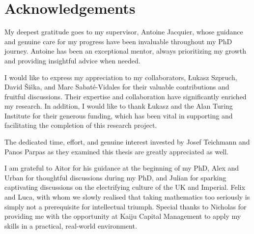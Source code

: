 \chapter*{Acknowledgements}



My deepest gratitude goes to my supervisor, Antoine Jacquier, whose guidance and genuine care for my progress have been invaluable throughout my PhD journey. Antoine has been an exceptional mentor, always prioritizing my growth and providing insightful advice when needed.

I would like to express my appreciation to my collaborators, Łukasz Szpruch, David Šiška, and Marc Sabaté-Vidales for their valuable contributions and fruitful discussions. Their expertise and collaboration have significantly enriched my research. In addition, I would like to thank Łukasz and the Alan Turing Institute for their generous funding, which has been vital in supporting and facilitating the completion of this research project.

The dedicated time, effort, and genuine interest invested by Josef Teichmann and Panos Parpas as they examined this thesis are greatly appreciated as well. %

I am grateful to Aitor for his guidance at the beginning of my PhD, Alex and Urban for thoughtful discussions during my PhD, and Julian for sparking captivating discussions on the electrifying culture of the UK and Imperial. Felix and Luca, with whom we slowly realised that taking mathematics too seriously is simply not a prerequisite for intellectual triumph. 
Special thanks to Nicholas for providing me with the opportunity at Kaiju Capital Management to apply my skills in a practical, real-world environment.

